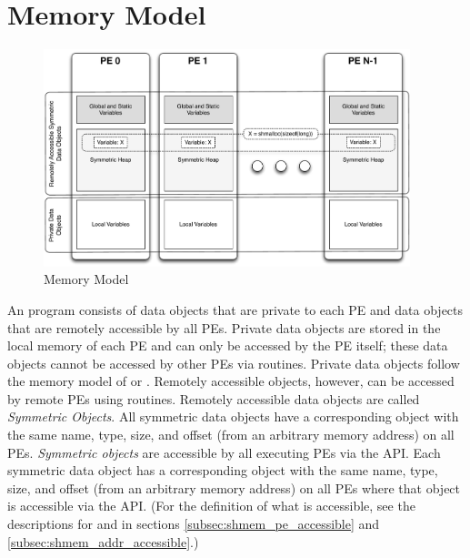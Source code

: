\section{Memory Model}
\begin{figure}[h]
\includegraphics[width=0.95\textwidth]{diagrams/updated/mem_model}      
\caption{\OSH{} Memory Model}                                   
\label{fig:mem_model}                                               
\end{figure}      
An \openshmem program consists of data objects that are private to each \ac{PE} and data  objects that are remotely accessible by all \ac{PE}s. Private data objects are stored in the local memory of each \ac{PE} and can only be accessed by the \ac{PE} itself; these data objects cannot be accessed by other \ac{PE}s via \openshmem routines. Private data objects follow the memory model of \Clang{} or \Fortran{}. Remotely accessible objects, however, can be accessed by remote \ac{PE}s using \openshmem routines.
Remotely accessible data objects are called \emph{Symmetric Objects}.
All symmetric data objects have a corresponding object with the same
name, type, size, and offset (from an arbitrary memory address) on all \ac{PE}s. \emph{Symmetric objects } are accessible by all executing \ac{PE}s via the \openshmem \ac{API}. 
Each symmetric data object has a corresponding object with the same name, type, size, and offset (from an arbitrary memory address) on all PEs where that object is accessible via the \openshmem \ac{API}. (For the definition of what is accessible, see the descriptions for  and  in sections \ref{subsec:shmem_pe_accessible} and \ref{subsec:shmem_addr_accessible}.)
